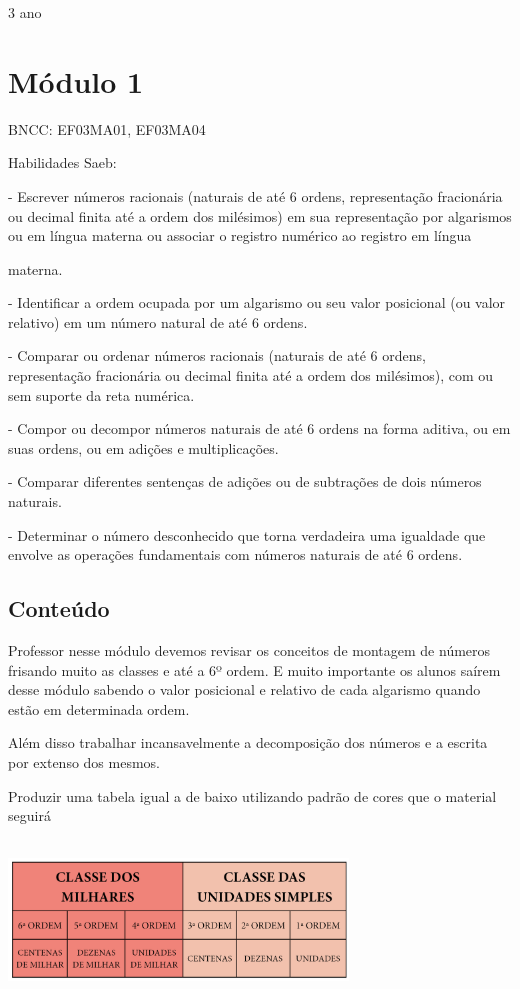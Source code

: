 3 ano

\section{Módulo 1}\label{muxf3dulo-1}

BNCC: EF03MA01, EF03MA04

Habilidades Saeb:

- Escrever números racionais (naturais de até 6 ordens, representação
fracionária ou decimal finita até a ordem dos milésimos) em sua
representação por algarismos ou em língua materna ou associar o registro
numérico ao registro em língua

materna.

- Identificar a ordem ocupada por um algarismo ou seu valor posicional
(ou valor relativo) em um número natural de até 6 ordens.

- Comparar ou ordenar números racionais (naturais de até 6 ordens,
representação fracionária ou decimal finita até a ordem dos milésimos),
com ou sem suporte da reta numérica.

- Compor ou decompor números naturais de até 6 ordens na forma aditiva,
ou em suas ordens, ou em adições e multiplicações.

- Comparar diferentes sentenças de adições ou de subtrações de dois
números naturais.

- Determinar o número desconhecido que torna verdadeira uma igualdade
que envolve as operações fundamentais com números naturais de até 6
ordens.

\subsection{Conteúdo}\label{conteuxfado}

Professor nesse módulo devemos revisar os conceitos de montagem de
números frisando muito as classes e até a 6º ordem. E muito importante
os alunos saírem desse módulo sabendo o valor posicional e relativo de
cada algarismo quando estão em determinada ordem.

Além disso trabalhar incansavelmente a decomposição dos números e a
escrita por extenso dos mesmos.

Produzir uma tabela igual a de baixo utilizando padrão de cores que o
material seguirá

\includegraphics[width=3.55128in,height=1.66618in]{media/image1.png}

